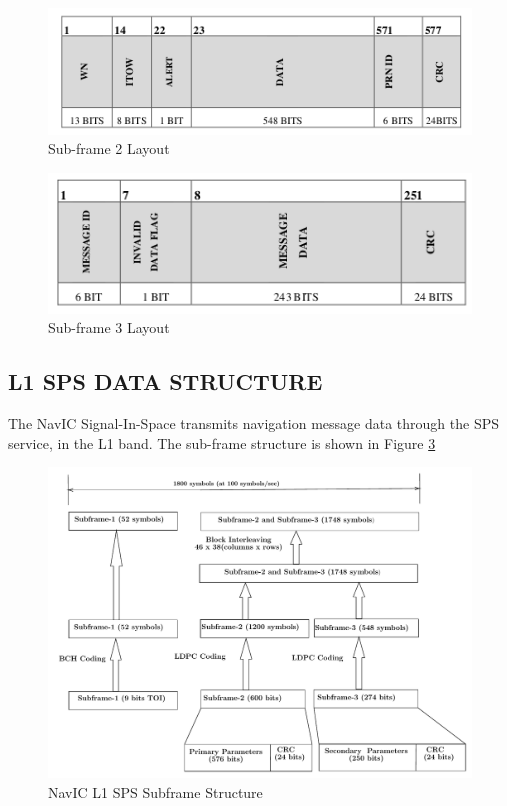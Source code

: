 \begin{figure}[ht]
\centering
\includegraphics[width=0.8\columnwidth]{figs/subframe2.png}
\centering
\captionsetup{justification=centering}
\caption{Sub-frame 2 Layout}
\label{fig:subframe2}
\end{figure}

\begin{figure}[ht]
\centering
\includegraphics[width=0.8\columnwidth]{figs/subframe3.png}
\centering
\captionsetup{justification=centering}
\caption{Sub-frame 3 Layout}
\label{fig:subframe3}
\end{figure}
\subsection{L1 SPS DATA STRUCTURE}
The NavIC Signal-In-Space transmits navigation message data through the SPS service, in the L1 band. The sub-frame structure is shown in Figure \ref{fig: SPS_Structure}
\begin{figure}[ht]
\centering
\includegraphics[width=0.8\columnwidth]{figs/spsframe}
\centering
\captionsetup{justification=centering}
\caption{NavIC L1 SPS Subframe Structure}
\label{fig: SPS_Structure}
\end{figure}

